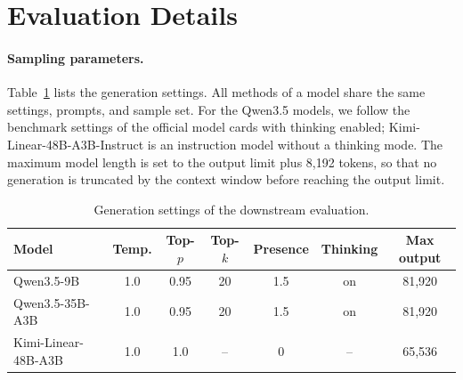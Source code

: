 \section{Evaluation Details}
\label{app:eval-details}

\paragraph{Sampling parameters.}
Table~\ref{tab:sampling} lists the generation settings.
All methods of a model share the same settings, prompts, and sample set.
For the Qwen3.5 models, we follow the benchmark settings of the official model cards with thinking enabled; Kimi-Linear-48B-A3B-Instruct is an instruction model without a thinking mode.
The maximum model length is set to the output limit plus 8,192 tokens, so that no generation is truncated by the context window before reaching the output limit.

\begin{table}[h]
  \centering
  \small
  \caption{Generation settings of the downstream evaluation.}
  \label{tab:sampling}
  \begin{tabular}{@{}lcccccc@{}}
    \toprule
    Model & Temp. & Top-$p$ & Top-$k$ & Presence & Thinking & Max output \\
    \midrule
    Qwen3.5-9B & 1.0 & 0.95 & 20 & 1.5 & on & 81{,}920 \\
    Qwen3.5-35B-A3B & 1.0 & 0.95 & 20 & 1.5 & on & 81{,}920 \\
    Kimi-Linear-48B-A3B & 1.0 & 1.0 & -- & 0 & -- & 65{,}536 \\
    \bottomrule
  \end{tabular}
\end{table}
